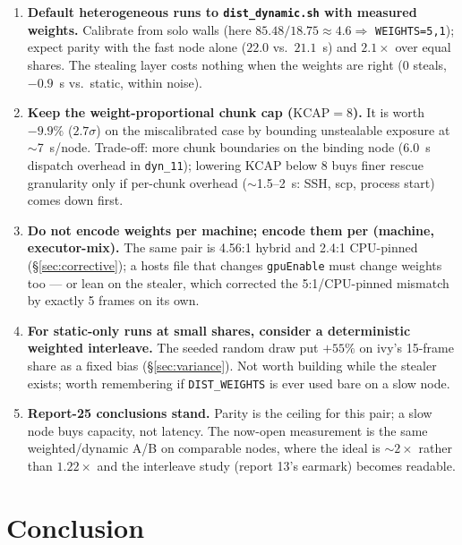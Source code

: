 \documentclass[
	english,
	letterpaper, oneside
]{article}
\begin{document}
\begin{enumerate}
  \item \textbf{Default heterogeneous runs to
        \texttt{dist\_dynamic.sh} with measured weights.} Calibrate from
        solo walls (here $85.48/18.75 \approx 4.6 \Rightarrow$
        \texttt{WEIGHTS=5,1}); expect parity with the fast node alone
        ($22.0$ vs.\ $21.1$~s) and $2.1\times$ over equal shares. The
        stealing layer costs nothing when the weights are right
        (0 steals, $-0.9$~s vs.\ static, within noise).
  \item \textbf{Keep the weight-proportional chunk cap
        ($\mathrm{KCAP}=8$).} It is worth $-9.9\%$ ($2.7\sigma$) on the
        miscalibrated case by bounding unstealable exposure at
        $\sim$7~s/node. Trade-off: more chunk boundaries on the binding
        node ($6.0$~s dispatch overhead in \texttt{dyn\_11}); lowering
        KCAP below 8 buys finer rescue granularity only if per-chunk
        overhead ($\sim$1.5--2~s: SSH, scp, process start) comes down
        first.
  \item \textbf{Do not encode weights per machine; encode them per
        (machine, executor-mix).} The same pair is 4.56:1 hybrid and
        2.4:1 CPU-pinned (\S\ref{sec:corrective}); a hosts file that
        changes \texttt{gpuEnable} must change weights too --- or lean on
        the stealer, which corrected the 5:1/CPU-pinned mismatch by
        exactly 5 frames on its own.
  \item \textbf{For static-only runs at small shares, consider a
        deterministic weighted interleave.} The seeded random draw put
        $+55\%$ on ivy's 15-frame share as a fixed bias
        (\S\ref{sec:variance}). Not worth building while the stealer
        exists; worth remembering if \texttt{DIST\_WEIGHTS} is ever used
        bare on a slow node.
  \item \textbf{Report-25 conclusions stand.} Parity is the ceiling for
        this pair; a slow node buys capacity, not latency. The now-open
        measurement is the same weighted/dynamic A/B on comparable nodes,
        where the ideal is $\sim$$2\times$ rather than $1.22\times$ and
        the interleave study (report 13's earmark) becomes readable.
\end{enumerate}

\section{Conclusion}
\label{sec:conclusion}
\end{document}
